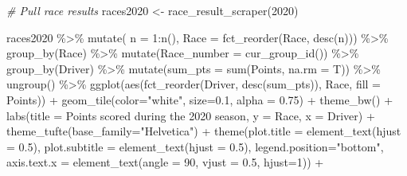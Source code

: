\documentclass[
]{book}
\newenvironment{Shaded}{\begin{snugshade}}{\end{snugshade}}
\newcommand{\AttributeTok}[1]{\textcolor[rgb]{0.77,0.63,0.00}{#1}}
\newcommand{\CommentTok}[1]{\textcolor[rgb]{0.56,0.35,0.01}{\textit{#1}}}
\newcommand{\DecValTok}[1]{\textcolor[rgb]{0.00,0.00,0.81}{#1}}
\newcommand{\FloatTok}[1]{\textcolor[rgb]{0.00,0.00,0.81}{#1}}
\newcommand{\FunctionTok}[1]{\textcolor[rgb]{0.00,0.00,0.00}{#1}}
\newcommand{\NormalTok}[1]{#1}
\newcommand{\OtherTok}[1]{\textcolor[rgb]{0.56,0.35,0.01}{#1}}
\newcommand{\SpecialCharTok}[1]{\textcolor[rgb]{0.00,0.00,0.00}{#1}}
\newcommand{\StringTok}[1]{\textcolor[rgb]{0.31,0.60,0.02}{#1}}
\begin{document}
\begin{Shaded}
\begin{Highlighting}[]
\CommentTok{\# Pull race results}
\NormalTok{races2020 }\OtherTok{\textless{}{-}} \FunctionTok{race\_result\_scraper}\NormalTok{(}\DecValTok{2020}\NormalTok{)}

\NormalTok{races2020 }\SpecialCharTok{\%\textgreater{}\%}
  \FunctionTok{mutate}\NormalTok{( }\AttributeTok{n =} \DecValTok{1}\SpecialCharTok{:}\FunctionTok{n}\NormalTok{(),}
          \AttributeTok{Race =} \FunctionTok{fct\_reorder}\NormalTok{(Race, }\FunctionTok{desc}\NormalTok{(n))) }\SpecialCharTok{\%\textgreater{}\%}
  \FunctionTok{group\_by}\NormalTok{(Race) }\SpecialCharTok{\%\textgreater{}\%} 
  \FunctionTok{mutate}\NormalTok{(}\AttributeTok{Race\_number =} \FunctionTok{cur\_group\_id}\NormalTok{()) }\SpecialCharTok{\%\textgreater{}\%}
  \FunctionTok{group\_by}\NormalTok{(Driver) }\SpecialCharTok{\%\textgreater{}\%} 
  \FunctionTok{mutate}\NormalTok{(}\AttributeTok{sum\_pts =} \FunctionTok{sum}\NormalTok{(Points, }\AttributeTok{na.rm =}\NormalTok{ T)) }\SpecialCharTok{\%\textgreater{}\%}
  \FunctionTok{ungroup}\NormalTok{() }\SpecialCharTok{\%\textgreater{}\%} 
  \FunctionTok{ggplot}\NormalTok{(}\FunctionTok{aes}\NormalTok{(}\FunctionTok{fct\_reorder}\NormalTok{(Driver, }\FunctionTok{desc}\NormalTok{(sum\_pts)), Race, }\AttributeTok{fill =}\NormalTok{ Points)) }\SpecialCharTok{+}
  \FunctionTok{geom\_tile}\NormalTok{(}\AttributeTok{color=}\StringTok{"white"}\NormalTok{, }\AttributeTok{size=}\FloatTok{0.1}\NormalTok{, }\AttributeTok{alpha =} \FloatTok{0.75}\NormalTok{) }\SpecialCharTok{+}
  \FunctionTok{theme\_bw}\NormalTok{() }\SpecialCharTok{+}
  \FunctionTok{labs}\NormalTok{(}\AttributeTok{title =} \StringTok{\textquotesingle{}Points scored during the 2020 season\textquotesingle{}}\NormalTok{,}
       \AttributeTok{y =} \StringTok{\textquotesingle{}Race\textquotesingle{}}\NormalTok{,}
       \AttributeTok{x =} \StringTok{\textquotesingle{}Driver\textquotesingle{}}\NormalTok{) }\SpecialCharTok{+} 
  \FunctionTok{theme\_tufte}\NormalTok{(}\AttributeTok{base\_family=}\StringTok{"Helvetica"}\NormalTok{)  }\SpecialCharTok{+}
  \FunctionTok{theme}\NormalTok{(}\AttributeTok{plot.title =} \FunctionTok{element\_text}\NormalTok{(}\AttributeTok{hjust =} \FloatTok{0.5}\NormalTok{),}
        \AttributeTok{plot.subtitle =} \FunctionTok{element\_text}\NormalTok{(}\AttributeTok{hjust =} \FloatTok{0.5}\NormalTok{),}
        \AttributeTok{legend.position=}\StringTok{"bottom"}\NormalTok{,}
        \AttributeTok{axis.text.x =} \FunctionTok{element\_text}\NormalTok{(}\AttributeTok{angle =} \DecValTok{90}\NormalTok{, }\AttributeTok{vjust =} \FloatTok{0.5}\NormalTok{, }\AttributeTok{hjust=}\DecValTok{1}\NormalTok{)) }\SpecialCharTok{+}

\end{Highlighting}
\end{Shaded}
\end{document}
